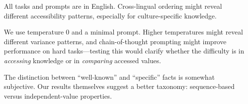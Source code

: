All tasks and prompts are in English.
Cross-lingual ordering might reveal different accessibility patterns, especially for culture-specific knowledge.

We use temperature 0 and a minimal prompt.
Higher temperatures might reveal different variance patterns, and chain-of-thought prompting might improve performance on hard tasks---testing this would clarify whether the difficulty is in \emph{accessing} knowledge or in \emph{comparing} accessed values.

The distinction between ``well-known'' and ``specific'' facts is somewhat subjective.
Our results themselves suggest a better taxonomy: sequence-based versus independent-value properties.
